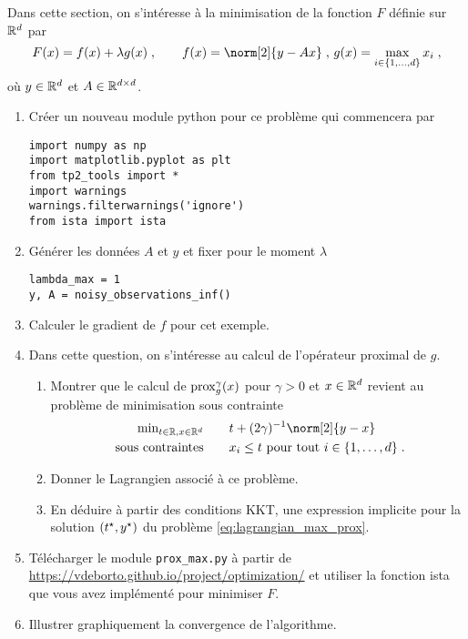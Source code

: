 \documentclass[a4paper,french,12pt]{article}
\begin{document}
Dans cette section, on s'intéresse à la minimisation de la fonction $F$ définie sur $\mathbb{R}^d$ par
\begin{equation*}
  F(x) = f(x) + \lambda g(x) \eqsp, \qquad f(x) = \norm[2]{y-Ax} \eqsp, \, g(x)= \max_{i \in \{1,\ldots,d\}} x_i \eqsp,
\end{equation*}
où $y \in \mathbb{R}^d$ et $A \in \mathbb{R}^{d\times d}$. 
\begin{enumerate}
\item Créer un nouveau module python pour ce problème qui commencera par
\begin{lstlisting}
import numpy as np
import matplotlib.pyplot as plt
from tp2_tools import *
import warnings
warnings.filterwarnings('ignore')
from ista import ista
\end{lstlisting}
\item Générer les données $A$ et $y$ et fixer pour le moment $\lambda$
  \begin{lstlisting}
lambda_max = 1
y, A = noisy_observations_inf()
  \end{lstlisting}
\item Calculer le gradient de $f$ pour cet exemple.
\item Dans cette question, on s'intéresse au calcul de l'opérateur proximal de $g$.
  \begin{enumerate}
  \item Montrer que le calcul de $\operatorname{prox}_g^{\gamma}(x)$ pour $\gamma>0$ et $x \in \mathbb{R}^d$ revient au problème de minimisation sous contrainte
    \begin{equation}
      \label{eq:lagrangian_max_prox}
      \begin{aligned}
      \text{min}_{t \in \rset, x \in \rset^d} &\qquad t + (2\gamma)^{-1} \norm[2]{y-x} \\
      \text{ sous contraintes} &\qquad x_i \leq t \text{ pour tout $i \in \{1,\ldots,d\}$} \eqsp.
      \end{aligned}
    \end{equation}
  \item Donner le Lagrangien associé à ce problème.
  \item En déduire à partir des conditions KKT, une expression
    implicite pour la solution $(t^{\star},y^{\star})$ du problème \eqref{eq:lagrangian_max_prox}.     
  \end{enumerate}
  
\item Télécharger le module  \lstinline+prox_max.py+ à partir de \url{https://vdeborto.github.io/project/optimization/} et utiliser la fonction ista que vous avez implémenté pour minimiser $F$.
  
\item Illustrer graphiquement la convergence de l'algorithme. 
\end{enumerate}
\end{document}

